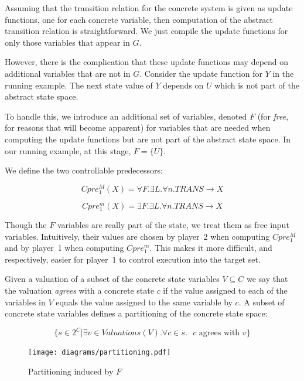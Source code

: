 Assuming that the transition relation for the concrete system is given as update functions, one for each concrete variable, then computation of the abstract transition relation is straightforward. We just compile the update functions for only those variables that appear in $G$.

However, there is the complication that these update functions may depend on additional variables that are not in $G$. Consider the update function for $Y$ in the running example. The next state value of $Y$ depends on $U$ which is not part of the abstract state space.

To handle this, we introduce an additional set of variables, denoted $F$ (for \emph{free}, for reasons that will become apparent) for variables that are needed when computing the update functions but are not part of the abstract state space. In our running example, at this stage, $F=\{U\}$.

We define the two controllable predecessors:

\begin{equation}
    \label{eqn:symb_cpre_M}
    Cpre_1^M(X) = \forall F. \exists L. \forall n. TRANS \rightarrow X
\end{equation}

\begin{equation}
    \label{eqn:symb_cpre_m}
    Cpre_1^m(X) = \exists F. \exists L. \forall n. TRANS \rightarrow X
\end{equation}

Though the $F$ variables are really part of the state, we treat them as free input variables. Intuitively, their values are chosen by player~2 when computing $Cpre_1^M$ and by player~1 when computing $Cpre_1^m$. This makes it more difficult, and respectively, easier for player~1 to control execution into the target set.

Given a valuation of a subset of the concrete state variables $V \subseteq C$ we say that the valuation \emph{agrees} with a concrete state $c$ if the value assigned to each of the variables in $V$ equals the value assigned to the same variable by $c$. A subset of concrete state variables defines a partitioning of the concrete state space: 

\begin{equation}
    \{ s \in 2^C | \exists v \in Valuations(V). \forall c \in s. \text{ $c$ agrees with $v$} \}
\end{equation}

\begin{figure}
\centering
\texttt{[image: diagrams/partitioning.pdf]}
\caption{Partitioning induced by $F$}
\label{fig:f_partitioning}
\end{figure}

